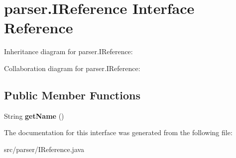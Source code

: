\hypertarget{interfaceparser_1_1_i_reference}{}\section{parser.\+I\+Reference Interface Reference}
\label{interfaceparser_1_1_i_reference}


Inheritance diagram for parser.\+I\+Reference\+:


Collaboration diagram for parser.\+I\+Reference\+:
\subsection*{Public Member Functions}
\begin{DoxyCompactItemize}
\item 
String {\bfseries get\+Name} ()\hypertarget{interfaceparser_1_1_i_reference_a8884e5b8fb044b21545408aa127e8ea2}{}\label{interfaceparser_1_1_i_reference_a8884e5b8fb044b21545408aa127e8ea2}

\end{DoxyCompactItemize}


The documentation for this interface was generated from the following file\+:\begin{DoxyCompactItemize}
\item 
src/parser/I\+Reference.\+java\end{DoxyCompactItemize}
